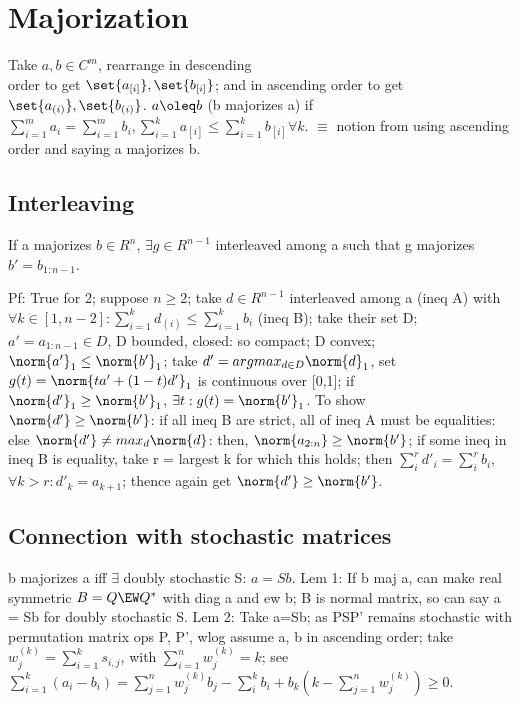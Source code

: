 \documentclass[oneside, article]{memoir}
\begin{document}
\section{Majorization}
Take $a, b \in C^{m}$, rearrange in descending\\
 order to get $\set{a_{[i]}}, \set{b_{[i]}}$; and in ascending order to get $\set{a_{(i)}}, \set{b_{(i)}}$. $a \oleq b$ (b majorizes a) if $\sum_{i=1}^{m} a_{i} = \sum_{i=1}^{m} b_{i}, \sum_{i=1}^{k}a_{[i]} \leq \sum_{i=1}^{k}b_{[i]} \forall k$. $\equiv$ notion from using ascending order and saying a majorizes b.

\subsection{Interleaving}
If a majorizes $b \in R^{n}$, $\exists g \in R^{n-1}$ interleaved among a such that g majorizes $b' = b_{1:n-1}$.

Pf: True for 2; suppose $n \geq 2$; take $d \in R^{n-1}$ interleaved among a (ineq A) with $\forall k \in [1, n-2]: \sum_{i=1}^{k} d_{(i)} \leq \sum_{i=1}^{k} b_{i}$ (ineq B); take their set D; $a' = a_{1:n-1}\in D$, D bounded, closed: so compact; D convex; $\norm{a'}_{1} \leq \norm{b'}_{1}$; take $d' = argmax_{d \in D} \norm{d}_{1}$, set $g(t) = \norm{ta' + (1-t)d'}_{1}$ is continuous over [0,1]; if $\norm{d'}_{1} \geq \norm{b'}_{1}$, $\exists t: g(t) = \norm{b'}_{1}$. To show $\norm{d'} \geq \norm{b'}$: if all ineq B are strict, all of ineq A must be equalities: else $\norm{d'} \neq max_{d} \norm{d}$: then, $\norm{a_{2:n}}\geq \norm{b'}$; if some ineq in ineq B is equality, take r = largest k for which this holds; then $\sum_{i}^{r}d'_{i} = \sum_{i}^{r} b_{i}$, $\forall k> r: d'_{k} = a_{k+1}$; thence again get $\norm{d'} \geq \norm{b'}$.

\subsection{Connection with stochastic matrices}
b majorizes a iff $\exists$ doubly stochastic S: $a = Sb$. Lem 1: If b maj a, can make real symmetric $B = Q\EW Q^{*}$ with diag a and ew b; B is normal matrix, so can say a = Sb for doubly stochastic S. Lem 2: Take a=Sb; as PSP' remains stochastic with permutation matrix ops P, P', wlog assume a, b in ascending order; take $w_{j}^{(k)} = \sum_{i=1}^{k}s_{i,j}$, with $\sum_{i=1}^{n}w_{j}^{(k)} = k$; see $\sum_{i=1}^{k} (a_{i} - b_{i}) = \sum_{j=1}^{n}w_{j}^{(k)}b_{j} - \sum_{i}^{k} b_{i} + b_{k}(k - \sum_{j=1}^{n} w_{j}^{(k)}) \geq 0$.
\end{document}
